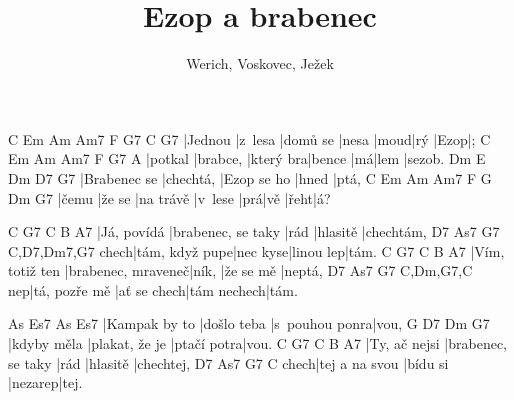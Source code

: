 \documentclass{song}
\title{Ezop a brabenec}
\author{Werich, Voskovec, Ježek}
\begin{document}
\strophe
C       Em      Am       Am7   F    G7  C    G7
|Jednou |z~lesa |domů se |nesa |moud|rý |Ezop|;
C       Em       Am        Am7    F  G7   A
|potkal |brabce, |který bra|bence |má|lem |sezob.
Dm           E         Dm          D7    G7
|Brabenec se |chechtá, |Ezop se ho |hned |ptá,
C     Em     Am        Am7     F   G   Dm   G7
|čemu |že se |na trávě |v~lese |prá|vě |řeht|á?
\endstrophe

\strophe
C           G7                 C    B        A7
|Já, povídá |brabenec, se taky |rád |hlasitě |chechtám,
     D7             As7      G7       C,D7,Dm7,G7
chech|tám, když pupe|nec kyse|linou lep|tám.
C               G7                 C     B         A7
|Vím, totiž ten |brabenec, mraveneč|ník, |že se mě |neptá,
   D7            As7         G7          C,Dm,G7,C
nep|tá, pozře mě |ať se chech|tám nechech|tám.
\endstrophe

\strophe
As            Es7         As             Es7
|Kampak by to |došlo teba |s~pouhou ponra|vou,
G           D7             Dm          G7
|kdyby měla |plakat, že je |ptačí potra|vou.
C             G7                C    B         A7
|Ty, ač nejsi |brabenec, se taky |rád |hlasitě |chechtej,
     D7            As7       G7      C
chech|tej a na svou |bídu si |nezarep|tej.
\endstrophe

\end{document}
